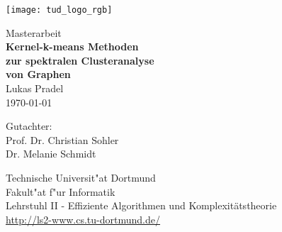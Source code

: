 \begin{titlepage}
\pagestyle{empty}
\vspace*{-2cm}
\newlength{\links}
\setlength{\links}{-1.5cm}
\rmfamily
\hspace*{\links}
\begin{minipage}{12.5cm}
\texttt{[image: tud\_logo\_rgb]}
\end{minipage}

\vspace*{4cm}

\hspace*{\links}
\hspace*{-0.2cm}
\begin{minipage}{9cm}
\large
\begin{center}
{\Large Masterarbeit} \\
\vspace*{1cm}
\textbf{Kernel-k-means Methoden\\zur spektralen Clusteranalyse\\von Graphen} \\
\vspace*{1cm}
Lukas Pradel\\
\today
\end{center}
\end{minipage}
\normalsize
\vspace*{4.8cm}


\vspace*{2.1cm}

\hspace*{\links}
\begin{minipage}[b]{5cm}
\raggedright
Gutachter: \\
Prof. Dr. Christian Sohler \\
Dr. Melanie Schmidt \\
\end{minipage}

\vspace*{2cm}
\hspace*{\links}
\begin{minipage}[b]{11cm}
\raggedright
Technische Universit"at Dortmund \\
Fakult"at f"ur Informatik\\
Lehrstuhl II - Effiziente Algorithmen und Komplexitätstheorie\\
\href{http://ls2-www.cs.tu-dortmund.de/}{http://ls2-www.cs.tu-dortmund.de/}
\end{minipage}
\end{titlepage}
\restoregeometry